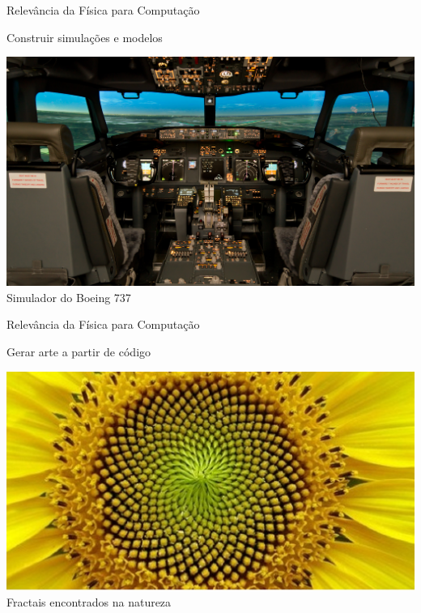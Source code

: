 \documentclass[xcolor=dvipsnames,table]{beamer}
\begin{document}
	\begin{frame}{Relevância da Física para Computação}
		\begin{block}{Construir simulações e modelos}
			\begin{center}
	    		\includegraphics[height=.7\textheight]{images/boeing737.jpg}
	    		\\Simulador do Boeing 737
	  		\end{center}
		\end{block}
	\end{frame}
	
	\begin{frame}{Relevância da Física para Computação}
		\begin{block}{Gerar arte a partir de código}
			\begin{center}
	    		\includegraphics[height=.7\textheight]{images/fractais.jpg}
	    		\\Fractais encontrados na natureza
	  		\end{center}
		\end{block}
	\end{frame}
	
\end{document}
